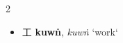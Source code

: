 \begin{multicols}{2}
\raggedcolumns


\begin{itemize}
    \item {\Large{工}}
    {\large{\textbf{kuwṅ}}}, \textit{kuwṅ}
    `work`












\end{itemize}
\end{multicols}
